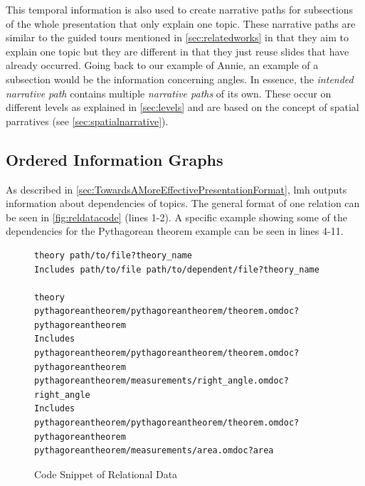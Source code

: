 \documentclass[twoside, 12pt]{article}
\begin{document}
This temporal information is also used to create narrative paths for subsections of the whole presentation that only explain one topic. These narrative paths are similar to the guided tours mentioned in \autoref{sec:relatedworks} in that they aim to explain one topic but they are different in that they just reuse slides that have already occurred. Going back to our example of Annie, an example of a subsection would be the information concerning angles. In essence, the \textit{intended narrative path} contains multiple \textit{narrative paths} of its own. These occur on different levels as explained in \autoref{sec:levels} and are based on the concept of spatial parratives (see \autoref{sec:spatialnarrative}).

\subsection{Ordered Information Graphs}
\label{sec:orderedInfoGraphs}

As described in \autoref{sec:TowardsAMoreEffectivePresentationFormat}, lmh outputs information about dependencies of topics. The general format of one relation can be seen in \autoref{fig:reldatacode} (lines 1-2). A specific example showing some of the dependencies for the Pythagorean theorem example can be seen in lines 4-11.\\

\begin{figure}
\vspace{-0pt}
\begin{verbatim}
theory path/to/file?theory_name
Includes path/to/file path/to/dependent/file?theory_name

theory 
pythagoreantheorem/pythagoreantheorem/theorem.omdoc?pythagoreantheorem
Includes 
pythagoreantheorem/pythagoreantheorem/theorem.omdoc?pythagoreantheorem
pythagoreantheorem/measurements/right_angle.omdoc?right_angle
Includes 
pythagoreantheorem/pythagoreantheorem/theorem.omdoc?pythagoreantheorem
pythagoreantheorem/measurements/area.omdoc?area
\end{verbatim}
\vspace{-5pt}
  \caption[Caption for LOF]{Code Snippet of Relational Data \footnotemark}
  \label{fig:reldatacode}
  \vspace{12pt}
\end{figure}

\begin{figure}
\vspace{-50pt}
\end{figure}
\end{document}
